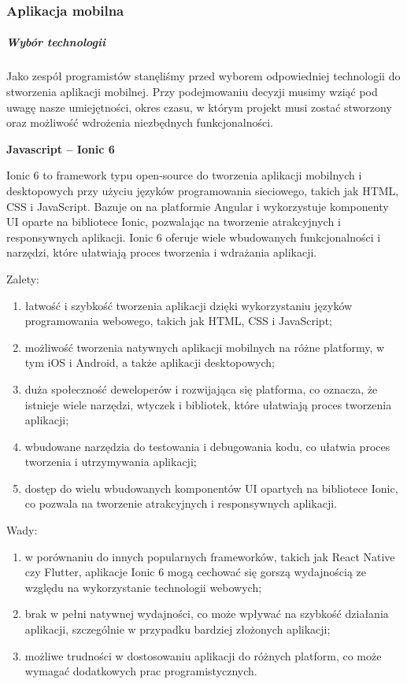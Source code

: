 \documentclass[12pt, a4paper, twoside, openany]{book}
\begin{document}


\subsubsection{Aplikacja mobilna}

\subparagraph{Wybór technologii}
Jako zespół programistów stanęliśmy przed wyborem odpowiedniej technologii do stworzenia aplikacji mobilnej. Przy podejmowaniu decyzji musimy wziąć pod uwagę nasze umiejętności, okres czasu, w którym projekt musi zostać stworzony oraz możliwość wdrożenia niezbędnych funkcjonalności.

\textbf{Javascript -- Ionic 6\\}

Ionic 6 to framework typu open-source do tworzenia aplikacji mobilnych i desktopowych przy użyciu języków programowania sieciowego, takich jak HTML, CSS i JavaScript. Bazuje on na platformie Angular i wykorzystuje komponenty UI oparte na bibliotece Ionic, pozwalając na tworzenie atrakcyjnych i responsywnych aplikacji. Ionic 6 oferuje wiele wbudowanych funkcjonalności i narzędzi, które ułatwiają proces tworzenia i wdrażania aplikacji.

Zalety:
\begin{enumerate}[label=--]
    \item łatwość i szybkość tworzenia aplikacji dzięki wykorzystaniu języków programowania webowego, takich jak HTML, CSS i JavaScript;
    \item możliwość tworzenia natywnych aplikacji mobilnych na różne platformy, w tym iOS i Android, a także aplikacji desktopowych;
    \item duża społeczność deweloperów i rozwijająca się platforma, co oznacza, że istnieje wiele narzędzi, wtyczek i bibliotek, które ułatwiają proces tworzenia aplikacji;
    \item wbudowane narzędzia do testowania i debugowania kodu, co ułatwia proces tworzenia i utrzymywania aplikacji;
    \item dostęp do wielu wbudowanych komponentów UI opartych na bibliotece Ionic, co pozwala na tworzenie atrakcyjnych i responsywnych aplikacji.
\end{enumerate}

Wady:
\begin{enumerate}[label=--]
    \item w porównaniu do innych popularnych frameworków, takich jak React Native czy Flutter, aplikacje Ionic 6 mogą cechować się gorszą wydajnością ze względu na wykorzystanie technologii webowych;
    \item brak w pełni natywnej wydajności, co może wpływać na szybkość działania aplikacji, szczególnie w przypadku bardziej złożonych aplikacji;
    \item możliwe trudności w dostosowaniu aplikacji do różnych platform, co może wymagać dodatkowych prac programistycznych.
\end{enumerate}
\end{document}
